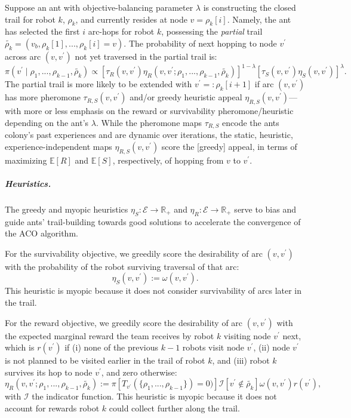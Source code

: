 \documentclass[11pt, oneside]{article}
\begin{document}
Suppose an ant with objective-balancing parameter $\lambda$ is constructing the closed trail for robot $k$, $\rho_k$, and currently resides at node $v=\rho_k[i]$.
Namely, the ant has selected the first $i$ arc-hops for robot $k$, possessing the \emph{partial} trail $\tilde{\rho_k}=(v_b, \rho_k[1], ..., \rho_k[i]=v)$.
The probability of next hopping to node $v^\prime$ across arc $(v, v^\prime)$ not yet traversed in the partial trail is:
 \begin{equation}
	\pi(v^\prime \mid \rho_1, ..., \rho_{k-1}, \tilde{\rho_k}) \propto 
		 \left[\tau_R(v, v^\prime) \eta_R(v, v^\prime; \rho_1, ..., \rho_{k-1},\tilde{\rho_k}) \right]^{1-\lambda} \left[ \tau_S(v, v^\prime) \eta_S(v, v^\prime) \right]^\lambda.
	 \label{eq:prob_x_y}
\end{equation}
The partial trail is more likely to be extended with $v^\prime=:\rho_k[i+1]$ if arc $(v, v^\prime)$ has more pheromone $\tau_{R, S}(v, v^\prime)$ and/or greedy heuristic appeal $\eta_{R, S}(v, v^\prime)$---with more or less emphasis on the reward or survivability pheromone/heuristic depending on the ant's $\lambda$. 
While the pheromone maps $\tau_{R,S}$ encode the ants colony's past experiences and are dynamic over iterations, the static, heuristic, experience-independent maps $\eta_{R,S}(v, v^\prime)$ score the [greedy] appeal, in terms of maximizing $\mathbb{E}[R]$ and $\mathbb{E}[S]$, respectively, of hopping from $v$ to $v^\prime$. 

\subparagraph{Heuristics.} The greedy and myopic heuristics $\eta_S: \mathcal{E} \rightarrow \mathbb{R}_+$ and $\eta_R:  \mathcal{E} \rightarrow \mathbb{R}_+$ serve to bias and guide ants' trail-building towards good solutions to accelerate the convergence of the ACO algorithm.

For the survivability objective, we greedily score the desirability of arc $(v, v^\prime)$ with the probability of the robot surviving traversal of that arc:
\begin{equation}
	\eta_S(v, v^\prime):=\omega(v, v^\prime).
\end{equation}
This heuristic is myopic because it does not consider survivability of arcs later in the trail. 

For the reward objective, we greedily score the desirability of arc $(v, v^\prime)$ with the expected marginal reward the team receives by robot $k$ visiting node $v^\prime$ next, which is $r(v^\prime)$ if 
(i) none of the previous $k-1$ robots visit node $v^\prime$, 
(ii) node $v^\prime$ is not planned to be visited earlier in the trail of robot $k$, and
(iii) robot $k$ survives its hop to node $v^\prime$,
and zero otherwise:
\begin{equation}
	\eta_R(v, v^\prime; \rho_1, ..., \rho_{k-1}, \tilde{\rho_k}) :=  
	 \pi[ T_{v^\prime}(\{\rho_1, ..., \rho_{k-1}\}) = 0)] \mathcal{I}[v^\prime \notin \tilde{\rho_k}] \omega(v, v^\prime) r(v^\prime ) ,
\end{equation}
with $\mathcal{I}$ the indicator function.
This heuristic is myopic because it does not account for rewards robot $k$ could collect further along the trail. 
\end{document}
